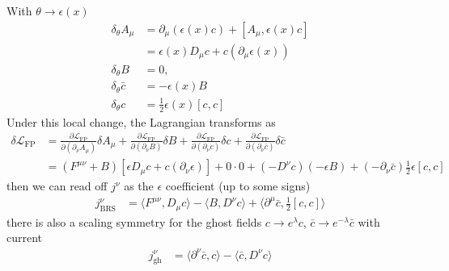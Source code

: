 \documentclass[10pt,a4paper]{article}
\theoremstyle{definition}
\begin{document}
\begin{enumerate}
With $\theta\rightarrow\epsilon(x)$
\begin{align}
\delta_\theta A_\mu
&=\partial_\mu(\epsilon(x)c)+[A_\mu,\epsilon(x)c]\\
&=\epsilon(x)D_\mu c+c(\partial_\mu\epsilon(x))\\
\delta_\theta B&=0,\\
\delta_\theta \bar{c}&=-\epsilon(x) B\\
\delta_\theta c&=\frac{1}{2}\epsilon(x)[c,c]
\end{align}
Under this local change, the Lagrangian transforms as
\begin{align}
\delta\mathcal{L}_\text{FP}
&=\frac{\partial\mathcal{L}_\text{FP}}{\partial (\partial_\nu A_\mu)}\delta A_\mu
+\frac{\partial\mathcal{L}_\text{FP}}{\partial (\partial_\nu B)}\delta B
+\frac{\partial\mathcal{L}_\text{FP}}{\partial (\partial_\nu c)}\delta c
+\frac{\partial\mathcal{L}_\text{FP}}{\partial(\partial_\nu \bar{c})}\delta\bar{c}\\
&=(F^{\mu\nu}+B)[\epsilon D_\mu c+c(\partial_\nu\epsilon)]+0\cdot0+(-D^\nu c)(-\epsilon B)+(-\partial_\nu\bar{c})\frac{1}{2}\epsilon[c,c]
\end{align}
then we can read off $j^\nu$ as the $\epsilon$ coefficient (up to some signs)
\begin{align}
j^\nu_\text{BRS}
&=\langle F^{\mu\nu}, D_\mu c\rangle-\langle B, D^\nu c\rangle+\langle\partial^\mu\bar{c},\frac{1}{2}[c,c]\rangle
\end{align}
there is also a scaling symmetry for the ghost fields $c\rightarrow e^\lambda c$, $\bar{c}\rightarrow e^{-\lambda} \bar{c}$  with current
\begin{align}
j^\nu_\text{gh}&=\langle\partial^\nu\bar{c}, c\rangle-\langle\bar{c}, D^\nu c\rangle
\end{align}


\end{enumerate}
\end{document}
